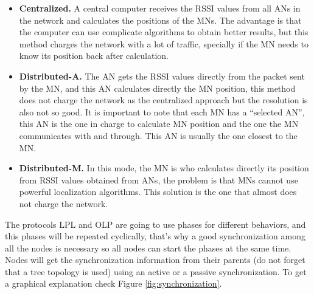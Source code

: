 \begin{itemize}
 \item \textbf{Centralized.} A central computer receives the \ac{RSSI} values from all \acp{AN} in the network and calculates the positions of 
the \acp{MN}. The advantage is that the computer can use complicate algorithms to obtain better results, but this method 
charges the network with a lot of traffic, specially if the \ac{MN} needs to know its position back after calculation.
 \item \textbf{Distributed-A.} The \ac{AN} gets the \ac{RSSI} values directly from the packet sent by the \ac{MN}, and this \ac{AN}
calculates directly the \ac{MN} position, this method does not charge the network as the centralized approach but the resolution 
is also not so good. It is important to note that each \ac{MN} has a ``selected \ac{AN}'', this \ac{AN} is the one in charge to 
calculate \ac{MN} position and the one the \ac{MN} communicates with and through. This \ac{AN} is usually the one closest to 
the \ac{MN}.
 \item \textbf{Distributed-M.} In this mode, the \ac{MN} is who calculates directly its position from \ac{RSSI} values obtained from \acp{AN},
the problem is that \acp{MN} cannot use powerful localization algorithms. This solution is the one that almost does not charge the network.
\end{itemize}

The protocols \ac{LPL} and \ac{OLP} are going to use phases for different behaviors, and this phases will be repeated cyclically, that's why 
a good synchronization among all the nodes is necessary so all nodes can start the phases at the same time. Nodes will get 
the synchronization information from their parents (do not forget that a tree topology is used) using an active or a passive synchronization. 
To get a graphical explanation check Figure \ref{fig:synchronization}.

